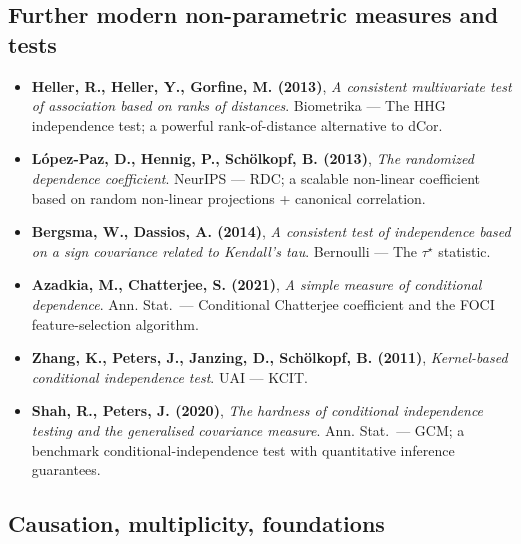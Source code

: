 \documentclass{article}
\providecommand{\tightlist}{\setlength{\itemsep}{0pt}\setlength{\parskip}{0pt}}
\begin{document}
\subsection{Further modern non-parametric measures and tests}\label{further-modern-tests}

\begin{itemize}
\tightlist
\item
  \textbf{Heller, R., Heller, Y., Gorfine, M. (2013)}, \emph{A
  consistent multivariate test of association based on ranks of
  distances}. Biometrika --- The HHG independence test; a powerful
  rank-of-distance alternative to dCor.
\item
  \textbf{L\'opez-Paz, D., Hennig, P., Sch\"olkopf, B. (2013)},
  \emph{The randomized dependence coefficient}. NeurIPS --- RDC; a
  scalable non-linear coefficient based on random non-linear
  projections + canonical correlation.
\item
  \textbf{Bergsma, W., Dassios, A. (2014)}, \emph{A consistent test of
  independence based on a sign covariance related to Kendall's tau}.
  Bernoulli --- The \(\tau^\star\) statistic.
\item
  \textbf{Azadkia, M., Chatterjee, S. (2021)}, \emph{A simple measure
  of conditional dependence}. Ann. Stat.\ --- Conditional Chatterjee
  coefficient and the FOCI feature-selection algorithm.
\item
  \textbf{Zhang, K., Peters, J., Janzing, D., Sch\"olkopf, B. (2011)},
  \emph{Kernel-based conditional independence test}. UAI --- KCIT.
\item
  \textbf{Shah, R., Peters, J. (2020)}, \emph{The hardness of
  conditional independence testing and the generalised covariance
  measure}. Ann. Stat.\ --- GCM; a benchmark conditional-independence
  test with quantitative inference guarantees.
\end{itemize}

\subsection{Causation, multiplicity,
foundations}\label{causation-multiplicity-foundations}
\end{document}
